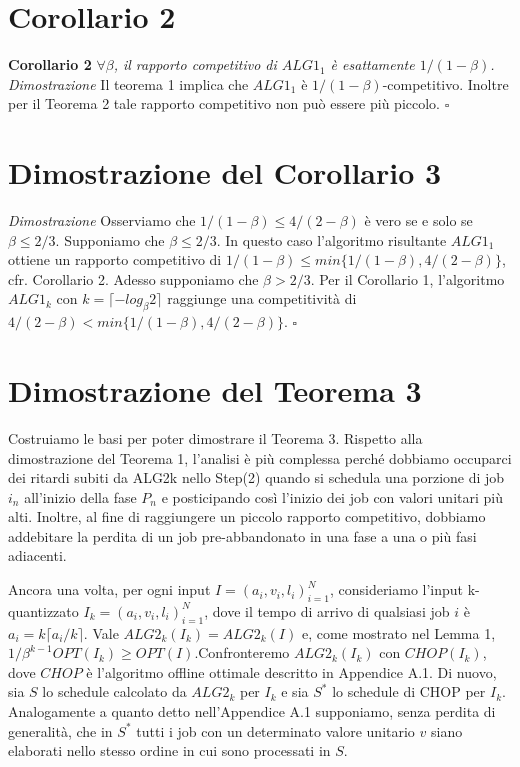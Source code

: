 \documentclass[twoside,openany,titlepage,fleqn,
	headinclude,12pt,a4paper,BCOR5mm,footinclude]{scrbook}
\begin{document}
\section{Corollario 2}
\textbf{Corollario 2}
\textit{$\forall \beta$, il rapporto competitivo di $ALG1_{1}$ è esattamente $1 / (1 - \beta)$.}\newline\newline
\textit{Dimostrazione}
Il teorema 1 implica che $ALG1_{1}$ è $1 / (1 - \beta )$-competitivo. Inoltre per il Teorema 2 tale rapporto competitivo non può essere più piccolo. \hfill $\square$ \vspace{5mm}

\section{Dimostrazione del Corollario 3}
\textit{Dimostrazione}
Osserviamo che $1 / (1 - \beta ) \leq 4 / (2 - \beta )$ è vero se e solo se $\beta  \leq 2/3$. Supponiamo che $\beta  \leq 2/3$. In questo caso l'algoritmo risultante $ALG1_{1}$ ottiene un rapporto competitivo di $1 / (1 - \beta ) \leq min \{1 / (1 - \beta ), 4 / (2 - \beta )\}$, cfr. Corollario 2. Adesso supponiamo che $\beta > 2/3$. Per il Corollario 1, l'algoritmo $ALG1_{k}$ con  $k = \lceil- log_{\beta}2\rceil$ raggiunge una competitività di $4 / (2 - \beta ) <min \{1 / (1 - \beta ), 4 / (2 - \beta )\}$. \hfill $\square$ 

\section{Dimostrazione del Teorema 3}
Costruiamo le basi per poter dimostrare il Teorema 3. Rispetto alla dimostrazione del Teorema 1, l'analisi è più complessa perché dobbiamo occuparci dei ritardi subiti da ALG2k nello Step(2) quando si schedula una porzione di job $i_{n}$ all'inizio della fase $P_{n}$ e posticipando così l'inizio dei job con valori unitari più alti. Inoltre, al fine di raggiungere un piccolo rapporto competitivo, dobbiamo addebitare la perdita di un job pre-abbandonato in una fase a una o più fasi adiacenti.

Ancora una volta, per ogni input $I = (a_{i}, v_{i}, l_{i})^{N}_{i = 1}$, consideriamo l'input k-quantizzato $I_{k} =(a_{i}, v_{i}, l_{i})^{N}_{i = 1}$, dove il tempo di arrivo di qualsiasi job $i$ è $a_{i} = k \lceil a_{i}/k \rceil$. Vale $ALG2_{k}(I_{k}) = ALG2_{k}(I)$ e, come mostrato nel Lemma 1, $1 / \beta^{k-1} OPT (I_{k}) \geq OPT(I)$.Confronteremo $ALG2_{k}(I_{k})$ con $CHOP(I_{k})$, dove $CHOP$ è l'algoritmo offline ottimale descritto in Appendice A.1. Di nuovo, sia $S$ lo schedule calcolato da $ALG2_{k}$ per $I_{k}$ e sia $S^{*}$ lo schedule di CHOP per $I_{k}$. Analogamente a quanto detto nell'Appendice A.1 supponiamo, senza perdita di generalità, che in $S^{*}$ tutti i job con un determinato valore unitario $v$ siano elaborati nello stesso ordine in cui sono processati in $S$.
\end{document}
